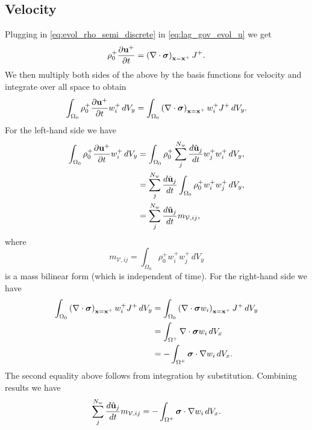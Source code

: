 \documentclass[11pt]{report}
\begin{document}
\subsection{Velocity}
Plugging in \cref{eq:evol_rho_semi_discrete} in \cref{eq:lag_gov_evol_u} we get
\begin{equation*}
    \rho^+_0 \frac{\partial \mathbf{u}^+}{\partial t} = \left ( \nabla \cdot \bm \sigma \right )_{\mathbf{x} = \mathbf{x}^+} J^+.
\end{equation*}
We then multiply both sides of the above by the basis functions for velocity and integrate over all space to obtain
\begin{equation*}
    \int_{\Omega_0} \rho^+_0 \frac{\partial \mathbf{u}^+}{\partial t} w^+_i \, dV_y = \int_{\Omega_0} \left ( \nabla \cdot \bm \sigma \right )_{\mathbf{x} = \mathbf{x}^+} w^+_i J^+ \, dV_y.
\end{equation*}
For the left-hand side we have
\begin{align*}
    \int_{\Omega_0} \rho^+_0 \frac{\partial \mathbf{u}^+}{\partial t} w^+_i \, dV_y &= \int_{\Omega_0} \rho^+_0 \sum_j^{N_w} \frac{d \hat{\mathbf{u}}_j}{dt} w^+_j w^+_i \, dV_y, \nonumber \\
    &= \sum_j^{N_w} \frac{d \hat{\mathbf{u}}_j}{dt} \int_{\Omega_0} \rho^+_0 w^+_i w^+_j \, dV_y, \nonumber \\
    &= \sum_j^{N_w} \frac{d \hat{\mathbf{u}}_j}{dt} m_{\mathcal{V},ij},
\end{align*}
where
\begin{equation}
    m_{\mathcal{V},ij} = \int_{\Omega_0} \rho^+_0 w^+_i w^+_j \, dV_y
\end{equation}
is a mass bilinear form (which is independent of time). For the right-hand side we have
\begin{align*}
    \int_{\Omega_0} \left ( \nabla \cdot \bm \sigma \right )_{\mathbf{x} = \mathbf{x}^+} w^+_i J^+ \, dV_y & = \int_{\Omega_0} \left ( \nabla \cdot \bm \sigma w_i \right )_{\mathbf{x} = \mathbf{x}^+} J^+ \, dV_y \nonumber \\
    & = \int_{\Omega^+} \nabla \cdot \bm \sigma w_i \, dV_x \nonumber \\
    & = -\int_{\Omega^+} \bm \sigma \cdot \nabla w_i \, dV_x.
\end{align*}
The second equality above follows from integration by substitution. Combining results we have
\begin{equation}
    \label{eq:evol_u_semi_discrete}
    \sum_j^{N_w} \frac{d \hat{\mathbf{u}}_j}{d t} m_{\mathcal{V},ij} = -\int_{\Omega^+} \bm \sigma \cdot \nabla w_i \, dV_x.
\end{equation}
\end{document}

